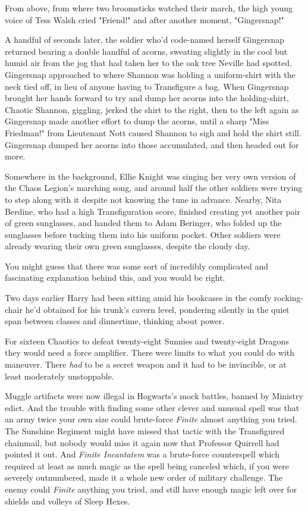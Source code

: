 From above, from where two broomsticks watched their march, the high young
voice of Tess Walsh cried "Friend!" and after another moment, "Gingersnap!"

A handful of seconds later, the soldier who'd code-named herself Gingersnap
returned bearing a double handful of acorns, sweating slightly in the cool but
humid air from the jog that had taken her to the oak tree Neville had spotted.
Gingersnap approached to where Shannon was holding a uniform-shirt with the
neck tied off, in lieu of anyone having to Transfigure a bag. When Gingersnap
brought her hands forward to try and dump her acorns into the holding-shirt,
Chaotic Shannon, giggling, jerked the shirt to the right, then to the left
again as Gingersnap made another effort to dump the acorns, until a sharp "Miss
Friedman!" from Lieutenant Nott caused Shannon to sigh and hold the shirt
still. Gingersnap dumped her acorns into those accumulated, and then headed out
for more.

Somewhere in the background, Ellie Knight was singing her very own version of
the Chaos Legion's marching song, and around half the other soldiers were
trying to step along with it despite not knowing the tune in advance. Nearby,
Nita Berdine, who had a high Transfiguration score, finished creating yet
another pair of green sunglasses, and handed them to Adam Beringer, who folded
up the sunglasses before tucking them into his uniform pocket. Other soldiers
were already wearing their own green sunglasses, despite the cloudy day.

You might guess that there was some sort of incredibly complicated and
fascinating explanation behind this, and you would be right.

Two days earlier Harry had been sitting amid his bookcases in the comfy
rocking-chair he'd obtained for his trunk's cavern level, pondering silently in
the quiet span between classes and dinnertime, thinking about power.

For sixteen Chaotics to defeat twenty-eight Sunnies and twenty-eight Dragons
they would need a force amplifier. There were limits to what you could do with
maneuver. There \emph{had} to be a secret weapon and it had to be invincible,
or at least moderately unstoppable.

Muggle artifacts were now illegal in Hogwarts's mock battles, banned by
Ministry edict. And the trouble with finding some other clever and unusual
spell was that an army twice your own size could brute-force \emph{Finite}
almost anything you tried. The Sunshine Regiment might have missed that tactic
with the Transfigured chainmail, but nobody would miss it again now that
Professor Quirrell had pointed it out. And \emph{Finite Incantatem} was a
brute-force counterspell which required at least as much magic as the spell
being canceled{\el} which, if you were severely outnumbered, made it a whole
new order of military challenge. The enemy could \emph{Finite} anything you
tried, and still have enough magic left over for shields and volleys of Sleep
Hexes.

